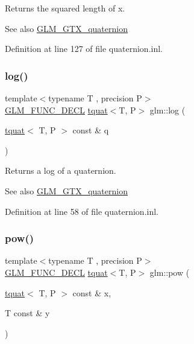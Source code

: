 Returns the squared length of x.

\begin{DoxySeeAlso}{See also}
\mbox{\hyperlink{group__gtx__quaternion}{G\+L\+M\+\_\+\+G\+T\+X\+\_\+quaternion}} 
\end{DoxySeeAlso}


Definition at line 127 of file quaternion.\+inl.

\mbox{\label{group__gtx__quaternion_ga791f42e134bfe97fc9c96f4668dd7489}} 
\subsubsection{\texorpdfstring{log()}{log()}}
{\footnotesize\ttfamily template$<$typename T , precision P$>$ \\
\mbox{\hyperlink{setup_8hpp_ab2d052de21a70539923e9bcbf6e83a51}{G\+L\+M\+\_\+\+F\+U\+N\+C\+\_\+\+D\+E\+CL}} \mbox{\hyperlink{structglm_1_1tquat}{tquat}}$<$T, P$>$ glm\+::log (\begin{DoxyParamCaption}\item[{\mbox{\hyperlink{structglm_1_1tquat}{tquat}}$<$ T, P $>$ const \&}]{q }\end{DoxyParamCaption})}

Returns a log of a quaternion.

\begin{DoxySeeAlso}{See also}
\mbox{\hyperlink{group__gtx__quaternion}{G\+L\+M\+\_\+\+G\+T\+X\+\_\+quaternion}} 
\end{DoxySeeAlso}


Definition at line 58 of file quaternion.\+inl.

\mbox{\label{group__gtx__quaternion_ga42a0cf206c59eaeff4c67dd62e09a580}} 
\subsubsection{\texorpdfstring{pow()}{pow()}}
{\footnotesize\ttfamily template$<$typename T , precision P$>$ \\
\mbox{\hyperlink{setup_8hpp_ab2d052de21a70539923e9bcbf6e83a51}{G\+L\+M\+\_\+\+F\+U\+N\+C\+\_\+\+D\+E\+CL}} \mbox{\hyperlink{structglm_1_1tquat}{tquat}}$<$T, P$>$ glm\+::pow (\begin{DoxyParamCaption}\item[{\mbox{\hyperlink{structglm_1_1tquat}{tquat}}$<$ T, P $>$ const \&}]{x,  }\item[{T const \&}]{y }\end{DoxyParamCaption})}

